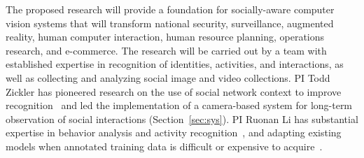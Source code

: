 The proposed research will provide a foundation for socially-aware computer vision systems that will transform national security, surveillance, augmented reality, human computer interaction, human resource planning, operations research, and e-commerce. The research will be carried out by a team with established expertise in recognition of identities, activities, and interactions, as well as collecting and analyzing social image and video collections. PI Todd Zickler has pioneered research on the use of social network context to improve recognition~\cite{Stone2008,Stone2010} and led the implementation of a camera-based system for long-term observation of social interactions (Section~\ref{sec:sys}). PI Ruonan Li has substantial expertise in behavior analysis and activity recognition~\cite{groupdet2013,LiIJCV2012,LiPAMI2012,Li2010}, and adapting existing models when annotated training data is difficult or expensive to acquire~\cite{LiZickler2012,Li2011}. 





